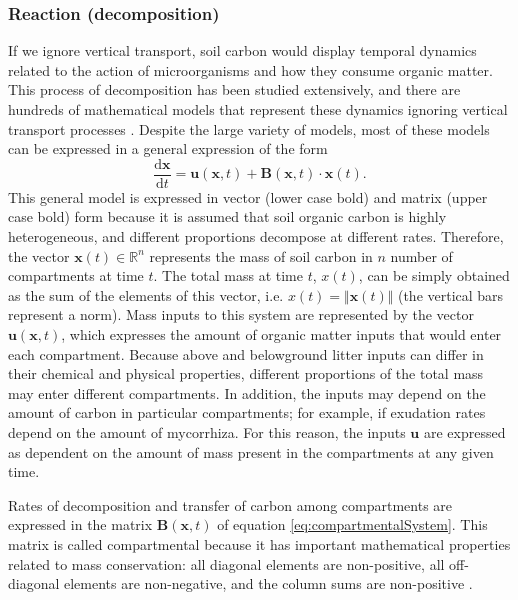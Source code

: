 \documentclass[11pt, oneside, a4paper]{article}   	%
\begin{document}
\subsubsection{Reaction (decomposition)}
If we ignore vertical transport, soil carbon would display temporal dynamics related to the action of microorganisms and how they consume organic matter. This process of decomposition has been studied extensively, and there are hundreds of mathematical models that represent these dynamics ignoring vertical transport processes \citep{Manzoni2009}. Despite the large variety of models, most of these models can be expressed in a general expression of the form \citep{Sierra2015EM, Sierra2018JAMES}
\begin{equation} \label{eq:compartmentalSystem}
\frac{\mathrm{d} \bm{x}}{\mathrm{d}t} = \bm{u}(\bm{x}, t) + \mathbf{B}(\bm{x}, t) \cdot \bm{x}(t) .
\end{equation}
This general model is expressed in vector (lower case bold) and matrix (upper case bold) form because it is assumed that soil organic carbon is highly heterogeneous, and different proportions  decompose at different rates. Therefore, the vector $\bm{x}(t) \in \mathbb{R}^n$ represents the mass of soil carbon in $n$ number of compartments at time $t$. The total mass at time $t$, $x(t)$, can be simply obtained as the sum of the elements of this vector, i.e. $x(t) = \Vert \bm{x}(t) \Vert$ (the vertical bars represent a norm). Mass inputs to this system are represented by the vector $\bm{u}(\bm{x}, t)$, which expresses the amount of organic matter inputs that would enter each compartment. Because above and belowground litter inputs can differ in their chemical and physical properties, different proportions of the total mass may enter different compartments. In addition, the inputs may depend on the amount of carbon in particular compartments; for example, if exudation rates depend on the amount of mycorrhiza. For this reason, the inputs $\bm{u}$ are expressed as dependent on the amount of mass present in the compartments at any given time. 

Rates of decomposition and transfer of carbon among compartments are expressed in the matrix $\mathbf{B}(\bm{x}, t)$ of equation \ref{eq:compartmentalSystem}. This matrix is called compartmental because it has important mathematical properties related to mass conservation: all diagonal elements are non-positive, all off-diagonal elements are non-negative, and the column sums are non-positive \citep{Metzler2018MG, Sierra2018JAMES}.
\end{document}
